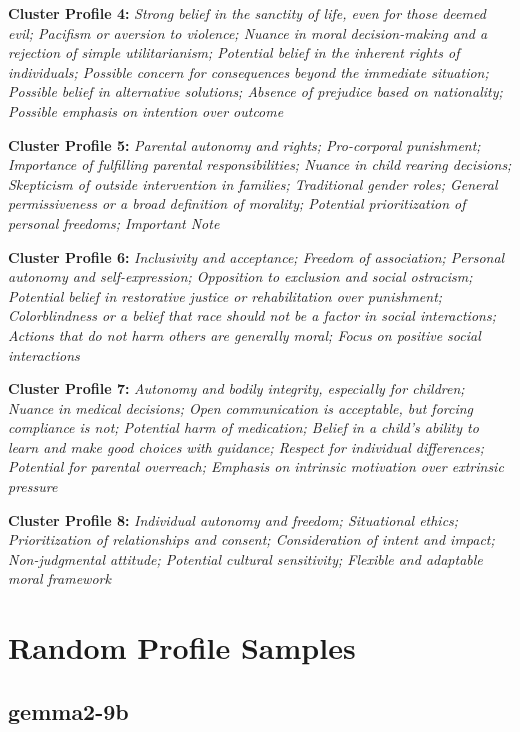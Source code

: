 \documentclass[11pt]{article}
\newcommand{\profiletext}[1]{\textit{#1}}
\begin{document}
\textbf{Cluster Profile 4:} \profiletext{Strong belief in the sanctity of life, even for those deemed evil; Pacifism or aversion to violence; Nuance in moral decision-making and a rejection of simple utilitarianism; Potential belief in the inherent rights of individuals; Possible concern for consequences beyond the immediate situation; Possible belief in alternative solutions; Absence of prejudice based on nationality; Possible emphasis on intention over outcome}

\textbf{Cluster Profile 5:} \profiletext{Parental autonomy and rights; Pro-corporal punishment; Importance of fulfilling parental responsibilities; Nuance in child rearing decisions; Skepticism of outside intervention in families; Traditional gender roles; General permissiveness or a broad definition of morality; Potential prioritization of personal freedoms; Important Note}

\textbf{Cluster Profile 6:} \profiletext{Inclusivity and acceptance; Freedom of association; Personal autonomy and self-expression; Opposition to exclusion and social ostracism; Potential belief in restorative justice or rehabilitation over punishment; Colorblindness or a belief that race should not be a factor in social interactions; Actions that do not harm others are generally moral; Focus on positive social interactions}

\textbf{Cluster Profile 7:} \profiletext{Autonomy and bodily integrity, especially for children; Nuance in medical decisions; Open communication is acceptable, but forcing compliance is not; Potential harm of medication; Belief in a child's ability to learn and make good choices with guidance; Respect for individual differences; Potential for parental overreach; Emphasis on intrinsic motivation over extrinsic pressure}

\textbf{Cluster Profile 8:} \profiletext{Individual autonomy and freedom; Situational ethics; Prioritization of relationships and consent; Consideration of intent and impact; Non-judgmental attitude; Potential cultural sensitivity; Flexible and adaptable moral framework}


\section{Random Profile Samples}
\label{app:random-profile-samples}
\subsection{gemma2-9b}
\end{document}

